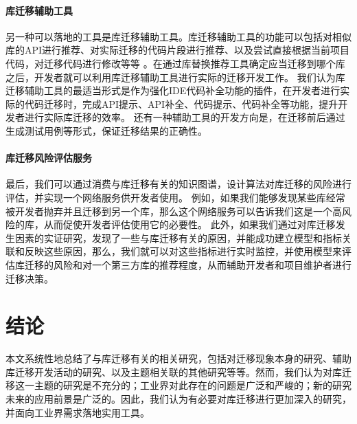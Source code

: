 \documentclass[UTF8]{ctexart}
\begin{document}
\paragraph{库迁移辅助工具}
另一种可以落地的工具是库迁移辅助工具。库迁移辅助工具的功能可以包括对相似库的API进行推荐、对实际迁移的代码片段进行推荐、以及尝试直接根据当前项目代码，对迁移代码进行修改等等
。在通过库替换推荐工具确定应当迁移到哪个库之后，开发者就可以利用库迁移辅助工具进行实际的迁移开发工作。
我们认为库迁移辅助工具的最适当形式是作为强化IDE代码补全功能的插件，在开发者进行实际的代码迁移时，完成API提示、API补全、代码提示、代码补全等功能，提升开发者进行实际库迁移的效率。
还有一种辅助工具的开发方向是，在迁移前后通过生成测试用例等形式，保证迁移结果的正确性。

\paragraph{库迁移风险评估服务}
最后，我们可以通过消费与库迁移有关的知识图谱，设计算法对库迁移的风险进行评估，并实现一个网络服务供开发者使用。
例如，如果我们能够发现某些库经常被开发者抛弃并且迁移到另一个库，那么这个网络服务可以告诉我们这是一个高风险的库，从而促使开发者评估使用它的必要性。
此外，如果我们通过对库迁移发生因素的实证研究，发现了一些与库迁移有关的原因，并能成功建立模型和指标关联和反映这些原因，那么，我们就可以对这些指标进行实时监控，并使用模型来评估库迁移的风险和对一个第三方库的推荐程度，从而辅助开发者和项目维护者进行迁移决策。

\section{结论}
\label{section:conclusion}
本文系统性地总结了与库迁移有关的相关研究，包括对迁移现象本身的研究、辅助库迁移开发活动的研究、以及主题相关联的其他研究等等。然而，我们认为对库迁移这一主题的研究是不充分的；工业界对此存在的问题是广泛和严峻的；新的研究未来的应用前景是广泛的。因此，我们认为有必要对库迁移进行更加深入的研究，并面向工业界需求落地实用工具。



\end{document}
